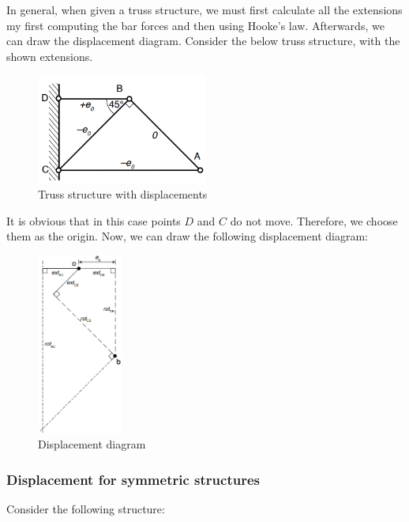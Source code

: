 \documentclass{article}
\begin{document}
In general, when given a truss structure, we must first calculate all the extensions my first computing the bar forces and then using Hooke's law. Afterwards, we can draw the displacement diagram. Consider the below truss structure, with the shown extensions.

\begin{figure}[h]
    \centering
    \includegraphics[width = 0.5\textwidth]{images/displacement1.png}
    \caption{Truss structure with displacements}
    \label{fig:enter-label}
\end{figure}

It is obvious that in this case points $D$ and $C$ do not move. Therefore, we choose them as the origin. Now, we can draw the following displacement diagram:

\begin{figure}[h]
    \centering
    \includegraphics[width = 0.25\textwidth]{images/displacement2.png}
    \caption{Displacement diagram}
    \label{fig:enter-label}
\end{figure}

\subsubsection{Displacement for symmetric structures}

Consider the following structure:
\end{document}
